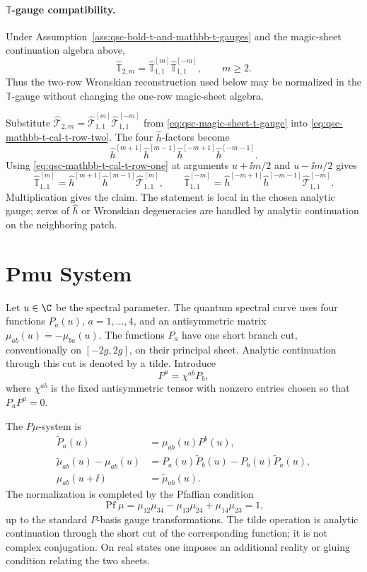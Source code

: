 \paragraph{\(\mathbb T\)-gauge compatibility.}
Under Assumption~\ref{ass:qsc-bold-t-and-mathbb-t-gauges} and
the magic-sheet continuation algebra above,
\[
  \widehat{\mathbb T}_{2,m}
  =
  \widehat{\mathbb T}_{1,1}^{[m]}
  \widehat{\mathbb T}_{1,1}^{[-m]},
  \qquad m\geq2 .
\]
Thus the two-row Wronskian reconstruction used below may be normalized in the
\(\mathbb T\)-gauge without changing the one-row magic-sheet algebra.

Substitute
\(\widehat{\mathcal T}_{2,m}
=\widehat{\mathcal T}_{1,1}^{[m]}
\widehat{\mathcal T}_{1,1}^{[-m]}\) from
\eqref{eq:qsc-magic-sheet-t-gauge} into
\eqref{eq:qsc-mathbb-t-cal-t-row-two}.  The four \(\widehat h\)-factors
become
\[
  \widehat h^{[m+1]}\widehat h^{[m-1]}
  \widehat h^{[-m+1]}\widehat h^{[-m-1]} .
\]
Using \eqref{eq:qsc-mathbb-t-cal-t-row-one} at arguments \(u+\ii m/2\) and
\(u-\ii m/2\) gives
\[
  \widehat{\mathbb T}_{1,1}^{[m]}
  =
  \widehat h^{[m+1]}\widehat h^{[m-1]}
  \widehat{\mathcal T}_{1,1}^{[m]},
  \qquad
  \widehat{\mathbb T}_{1,1}^{[-m]}
  =
  \widehat h^{[-m+1]}\widehat h^{[-m-1]}
  \widehat{\mathcal T}_{1,1}^{[-m]} .
\]
Multiplication gives the claim.  The statement is local in the chosen
analytic gauge; zeros of \(\widehat h\) or Wronskian degeneracies are handled
by analytic continuation on the neighboring patch.

\section{Pmu System}

Let \(u\in\C\) be the spectral parameter.  The quantum spectral curve uses four
functions \(P_a(u)\), \(a=1,\ldots,4\), and an antisymmetric matrix
\(\mu_{ab}(u)=-\mu_{ba}(u)\).  The functions \(P_a\) have one short branch
cut, conventionally on \([-2g,2g]\), on their principal sheet.  Analytic
continuation through this cut is denoted by a tilde.  Introduce
\[
  P^a=\chi^{ab}P_b,
\]
where \(\chi^{ab}\) is the fixed antisymmetric tensor with nonzero entries
chosen so that \(P_aP^a=0\).

The \(P\mu\)-system is
\begin{align}
  \widetilde P_a(u)&=\mu_{ab}(u)P^b(u),
  \label{eq:planar-n4-pmu-one}\\
  \widetilde\mu_{ab}(u)-\mu_{ab}(u)
  &=
  P_a(u)\widetilde P_b(u)-P_b(u)\widetilde P_a(u),
  \label{eq:planar-n4-pmu-two}\\
  \mu_{ab}(u+\ii)&=\widetilde\mu_{ab}(u).
  \label{eq:planar-n4-pmu-period}
\end{align}
The normalization is completed by the Pfaffian condition
\begin{equation}
  \operatorname{Pf}\mu
  =
  \mu_{12}\mu_{34}-\mu_{13}\mu_{24}+\mu_{14}\mu_{23}
  =
  1,
  \label{eq:planar-n4-pmu-pfaffian}
\end{equation}
up to the standard \(P\)-basis gauge transformations.  The tilde operation is
analytic continuation through the short cut of the corresponding function;
it is not complex conjugation.  On real states one imposes an additional
reality or gluing condition relating the two sheets.


